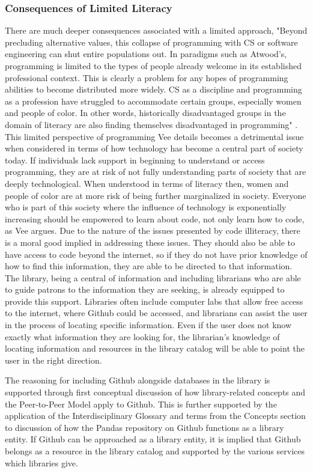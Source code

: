 \subsubsection{Consequences of Limited Literacy}

There are much deeper consequences associated with a limited approach, "Beyond precluding alternative values, this collapse of programming with CS or software engineering can shut entire populations out. In paradigms such as Atwood's, programming is limited to the types of people already welcome in its established professional context. This is clearly a problem for any hopes of programming abilities to become distributed more widely. CS as a discipline and programming as a profession have struggled to accommodate certain groups, especially women and people of color. In other words, historically disadvantaged groups in the domain of literacy are also finding themselves disadvantaged in programming" \cite{vee2017coding}. This limited perspective of programming Vee details becomes a detrimental issue when considered in terms of how technology has become a central part of society today. If individuals lack support in beginning to understand or access programming, they are at risk of not fully understanding parts of society that are deeply technological. When understood in terms of literacy then, women and people of color are at more risk of being further marginalized in society. Everyone who is part of this society where the influence of technology is exponentially increasing should be empowered to learn about code, not only learn how to code, as Vee argues\cite{vee2017coding}. Due to the nature of the issues presented by code illiteracy, there is a moral good implied in addressing these issues. They should also be able to have access to code beyond the internet, so if they do not have prior knowledge of how to find this information, they are able to be directed to that information. The library, being a central of information and including librarians who are able to guide patrons to the information they are seeking, is already equipped to provide this support. Libraries often include computer labs that allow free access to the internet, where Github could be accessed, and librarians can assist the user in the process of locating specific information. Even if the user does not know exactly what information they are looking for, the librarian's knowledge of locating information and resources in the library catalog will be able to point the user in the right direction. 

The reasoning for including Github alongside databases in the library is supported through first conceptual discussion of how library-related concepts and the Peer-to-Peer Model apply to Github. This is further supported by the application of the Interdisciplinary Glossary and terms from the Concepts section to discussion of how the Pandas repository on Github functions as a library entity. If Github can be approached as a library entity, it is implied that Github belongs as a resource in the library catalog and supported by the various services which libraries give.


